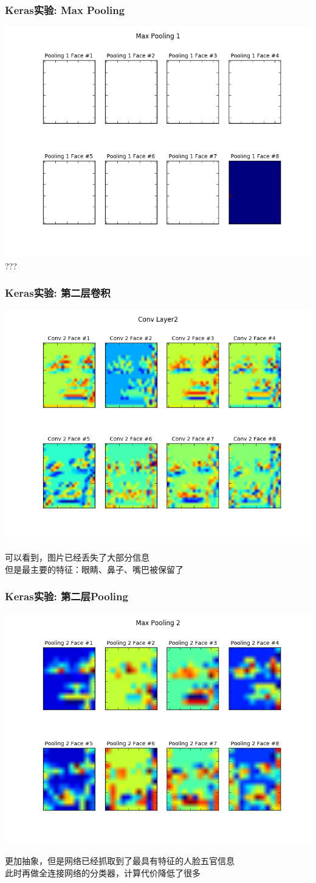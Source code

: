 \documentclass[24pt]{beamer}
\begin{document}
\begin{frame}
\frametitle{Keras实验: Max Pooling}
\begin{center}
\includegraphics[width=0.65\linewidth]{../image/pool1.png}\\
???
\end{center}
\end{frame}
\begin{frame}
\frametitle{Keras实验: 第二层卷积}
\begin{center}
\includegraphics[width=0.65\linewidth]{../image/conv2.png}
\end{center}
可以看到，图片已经丢失了大部分信息\\
但是最主要的特征：眼睛、鼻子、嘴巴被保留了
\end{frame}
\begin{frame}
\frametitle{Keras实验: 第二层Pooling}
\begin{center}
\includegraphics[width=0.65\linewidth]{../image/pool2.png}
\end{center}
更加抽象，但是网络已经抓取到了最具有特征的人脸五官信息\\
此时再做全连接网络的分类器，计算代价降低了很多
\end{frame}
\end{document}
